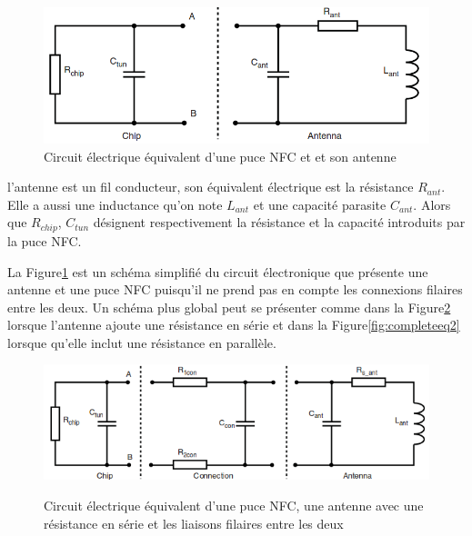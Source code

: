 \documentclass{themeensg}
\begin{document}
\begin{figure}[h!]
\centering
\label{fig:nfcandantenna}
\includegraphics[scale=0.5]{images/chipANDantenna.png}
\caption{Circuit électrique équivalent d'une puce NFC et et son antenne}
\end{figure}
l'antenne est un fil conducteur, son équivalent électrique est la résistance $R_{ant}$. Elle a aussi une inductance qu'on note $L_{ant}$ et une capacité parasite $C_{ant}$. Alors que $R_{chip}$, $C_{tun}$ désignent respectivement la résistance et la capacité introduits par la puce NFC.

La Figure\ref{fig:nfcandantenna} est un schéma simplifié du circuit électronique que présente une antenne et une puce NFC puisqu'il ne prend pas en compte les connexions filaires entre les deux. Un schéma plus global peut se présenter comme dans la Figure\ref{fig:completeeq} lorsque l'antenne ajoute une résistance en série et dans la Figure\ref{fig:completeeq2} lorsque qu'elle inclut une résistance en parallèle.

\begin{figure}[h!]
\includegraphics[scale=0.7]{images/chipANDantennaANDconn.png}
\label{fig:completeeq}
\caption{Circuit électrique équivalent d'une puce NFC, une antenne avec une résistance en série et les liaisons filaires entre les deux}
\end{figure}
\end{document}
